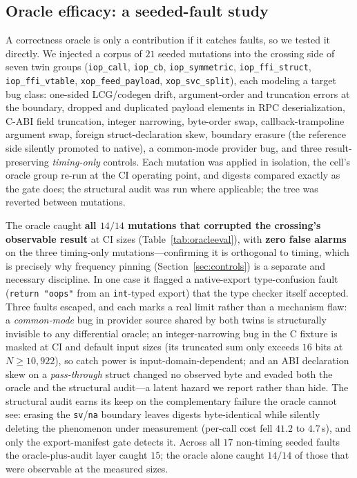 \documentclass[conference]{IEEEtran}
\newcommand{\code}[1]{\texttt{#1}}
\begin{document}
\subsection{Oracle efficacy: a seeded-fault study}
\label{sec:oracleeval}

A correctness oracle is only a contribution if it catches faults, so we tested it
directly. We injected a corpus of $21$ seeded mutations into the crossing side of
seven twin groups (\code{iop\_call}, \code{iop\_cb}, \code{iop\_symmetric},
\code{iop\_ffi\_struct}, \code{iop\_ffi\_vtable}, \code{xop\_feed\_payload},
\code{xop\_svc\_split}), each modeling a target bug class: one-sided LCG/codegen
drift, argument-order and truncation errors at the boundary, dropped and
duplicated payload elements in RPC deserialization, C-ABI field truncation,
integer narrowing, byte-order swap, callback-trampoline argument swap, foreign
struct-declaration skew, boundary erasure (the reference side silently promoted to
native), a common-mode provider bug, and three result-preserving \emph{timing-only}
controls. Each mutation was applied in isolation, the cell's oracle group re-run at
the CI operating point, and digests compared exactly as the gate does; the
structural audit was run where applicable; the tree was reverted between mutations.

The oracle caught \textbf{all $14/14$ mutations that corrupted the crossing's
observable result} at CI sizes (Table~\ref{tab:oracleeval}), with \textbf{zero
false alarms} on the three timing-only mutations---confirming it is orthogonal to
timing, which is precisely why frequency pinning (Section~\ref{sec:controls}) is a
separate and necessary discipline. In one case it flagged a native-export
type-confusion fault (\code{return "oops"} from an \code{int}-typed export) that
the type checker itself accepted. Three faults escaped, and each marks a real
limit rather than a mechanism flaw: a \emph{common-mode} bug in provider source
shared by both twins is structurally invisible to any differential oracle; an
integer-narrowing bug in the C fixture is masked at CI and default input sizes
(its truncated sum only exceeds $16$ bits at $N\ge10{,}922$), so catch power is
input-domain-dependent; and an ABI declaration skew on a \emph{pass-through}
struct changed no observed byte and evaded both the oracle and the structural
audit---a latent hazard we report rather than hide. The structural audit earns its
keep on the complementary failure the oracle cannot see: erasing the
\code{sv}/\code{na} boundary leaves digests byte-identical while silently deleting
the phenomenon under measurement (per-call cost fell $41.2$ to $4.7$\,\textmu s),
and only the export-manifest gate detects it. Across all $17$ non-timing seeded
faults the oracle-plus-audit layer caught $15$; the oracle alone caught
$14/14$ of those that were observable at the measured sizes.
\end{document}
